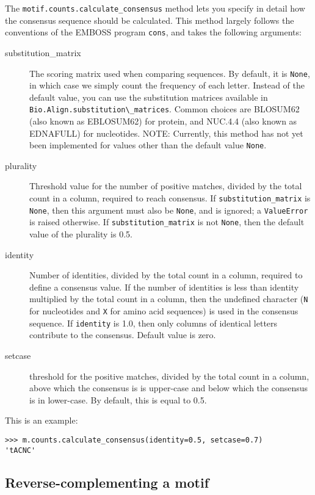 The \verb|motif.counts.calculate_consensus| method lets you specify in detail how the consensus sequence should be calculated. This method largely follows the conventions of the EMBOSS program \verb|cons|, and takes the following arguments:

\begin{description}
\item[substitution\_matrix] The scoring matrix used when comparing sequences. By default, it is \verb|None|, in which case we simply count the frequency of each letter.  Instead of the default value, you can use the substitution matrices available in \verb|Bio.Align.substitution\_matrices|. Common choices are BLOSUM62 (also known as EBLOSUM62) for protein, and NUC.4.4 (also known as EDNAFULL) for nucleotides. NOTE: Currently, this method has not yet been implemented for values other than the default value \verb|None|.
\item[plurality] Threshold value for the number of positive matches, divided by the total count in a column, required to reach consensus. If \verb|substitution_matrix| is \verb|None|, then this argument must also be \verb|None|, and is ignored; a \verb|ValueError| is raised otherwise. If \verb|substitution_matrix| is not \verb|None|, then the default value of the plurality is 0.5.
\item[identity] Number of identities, divided by the total count in a column, required to define a consensus value. If the number of identities is less than identity multiplied by the total count in a column, then the undefined character (\verb|N| for nucleotides and \verb|X| for amino acid sequences) is used in the consensus sequence. If \verb|identity| is 1.0, then only columns of identical letters contribute to the consensus. Default value is zero.
\item[setcase] threshold for the positive matches, divided by the total count in a column, above which the consensus is is upper-case and below which the consensus is in lower-case. By default, this is equal to 0.5.
\end{description}
This is an example:
\begin{verbatim}
>>> m.counts.calculate_consensus(identity=0.5, setcase=0.7)
'tACNC'
\end{verbatim}


\subsection{Reverse-complementing a motif}

